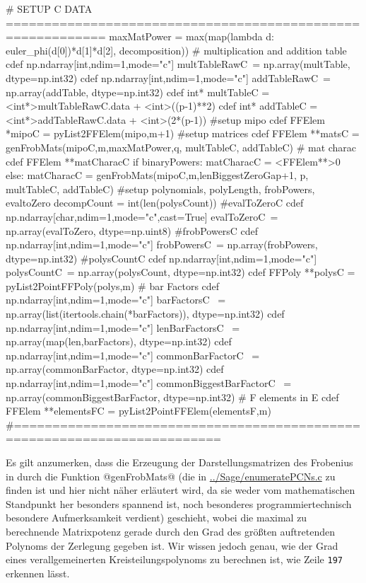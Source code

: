 \begin{sagecode}[caption={\texttt{countCompleteSubmoduleGenerators}
  Fortsetzung (III)}, 
  firstnumber=196]
    # SETUP C DATA ===========================================================
    maxMatPower = max(map(lambda d: euler_phi(d[0])*d[1]*d[2], decomposition))
        # multiplication and addition table
    cdef np.ndarray[int,ndim=1,mode="c"] multTableRawC\
        = np.array(multTable, dtype=np.int32)
    cdef np.ndarray[int,ndim=1,mode="c"] addTableRawC\
        = np.array(addTable, dtype=np.int32)
    cdef int* multTableC = <int*>multTableRawC.data + <int>((p-1)**2)
    cdef int* addTableC = <int*>addTableRawC.data + <int>(2*(p-1))
        #setup mipo
    cdef FFElem *mipoC = pyList2FFElem(mipo,m+1)
       #setup matrices
    cdef FFElem **matsC  = genFrobMats(mipoC,m,maxMatPower,q,
            multTableC, addTableC)
        # mat charac
    cdef FFElem **matCharacC
    if binaryPowers:
        matCharacC = <FFElem**>0
    else:
        matCharacC = genFrobMats(mipoC,m,lenBiggestZeroGap+1,
                p, multTableC, addTableC)
    #setup polynomials, polyLength, frobPowers, evaltoZero
    decompCount = int(len(polysCount))
        #evalToZeroC
    cdef np.ndarray[char,ndim=1,mode="c",cast=True] evalToZeroC\
            = np.array(evalToZero, dtype=np.uint8)
        #frobPowersC
    cdef np.ndarray[int,ndim=1,mode="c"] frobPowersC\
            = np.array(frobPowers, dtype=np.int32)
        #polysCountC
    cdef np.ndarray[int,ndim=1,mode="c"] polysCountC\
            = np.array(polysCount, dtype=np.int32)
    cdef FFPoly **polysC = pyList2PointFFPoly(polys,m)
        # bar Factors
    cdef np.ndarray[int,ndim=1,mode="c"] barFactorsC \
        = np.array(list(itertools.chain(*barFactors)), dtype=np.int32)
    cdef np.ndarray[int,ndim=1,mode="c"] lenBarFactorsC \
        = np.array(map(len,barFactors), dtype=np.int32)
    cdef np.ndarray[int,ndim=1,mode="c"] commonBarFactorC \
        = np.array(commonBarFactor, dtype=np.int32)
    cdef np.ndarray[int,ndim=1,mode="c"] commonBiggestBarFactorC \
        = np.array(commonBiggestBarFactor, dtype=np.int32)
        # F elements in E
    cdef FFElem **elementsFC = pyList2PointFFElem(elementsF,m)
    #=========================================================================
\end{sagecode}

Es gilt anzumerken, dass die Erzeugung der Darstellungsmatrizen des Frobenius
in \Clang durch die Funktion @genFrobMats@ 
(die in \url{../Sage/enumeratePCNs.c} zu finden ist und hier nicht näher
erläutert wird, da sie weder vom mathematischen Standpunkt her besonders
spannend ist, noch besonderes programmiertechnisch besondere Aufmerksamkeit
verdient)
geschieht, wobei die maximal zu berechnende
Matrixpotenz gerade durch den Grad des größten auftretenden Polynoms der
Zerlegung gegeben ist. Wir wissen jedoch genau, wie der Grad eines
verallgemeinerten Kreisteilungspolynoms zu berechnen ist, wie Zeile
\texttt{197} erkennen lässt.

